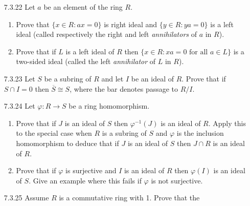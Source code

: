 \begin{enumerate}
   \item[7.3.22]  Let $a$ be an element of the ring $R$.
                  \begin{enumerate}
                     \item Prove that $\{x \in R : ax = 0\}$ is right ideal and
                           $\{y \in R : ya = 0\}$ is a left ideal (called
                           respectively the right and left \textit{annihilators}
                           of $a$ in $R$).
                     \item Prove that if $L$ is a left ideal of $R$ then
                           $\{x \in R : xa = 0 \text{ for all } a \in L\}$ is a
                           two-sided ideal (called the left \textit{annihilator}
                           of $L$ in $R$).
                  \end{enumerate}
   \item[7.3.23]  Let $S$ be a subring of $R$ and let $I$ be an ideal of $R$.
                  Prove that if $S \cap I = 0$ then $\overline{S} \cong S$,
                  where the bar denotes passage to $R/I$.
   \item[7.3.24]  Let $\varphi : R \rightarrow S$ be a ring homomorphism.
                  \begin{enumerate}
                     \item Prove that if $J$ is an ideal of $S$ then
                           $\varphi^{-1}(J)$ is an ideal of $R$. Apply this to
                           the special case when $R$ is a subring of $S$ and
                           $\varphi$ is the inclusion homomorphism to deduce
                           that if $J$ is an ideal of $S$ then $J \cap R$ is an
                           ideal of $R$.
                     \item Prove that if $\varphi$ is surjective and $I$ is an
                           ideal of $R$ then $\varphi(I)$ is an ideal of $S$.
                           Give an example where this fails if $\varphi$ is not
                           surjective.
                  \end{enumerate}
   \item[7.3.25]  Assume $R$ is a commutative ring with 1. Prove that the

\end{enumerate}
